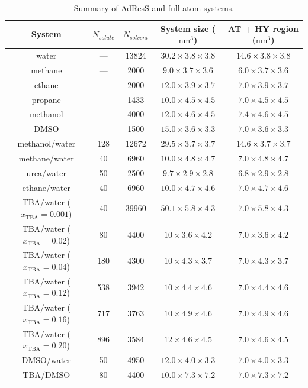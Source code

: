 \documentclass[a4paper,preprint,unsortedaddress]{revtex4-1}
\newcommand{\recheck}[1]{{\color{red} #1}}
\newcommand{\concenttba}{x_{\textrm{TBA}}}
\begin{document}
\begin{table}[]
\begin{center}
\begin{tabular}{ccccc}
\hline \hline
 System & $N_{solute}$ & $N_{solvent}$ & System size ($\textrm{nm}^{3}$) &  AT + HY region ($\textrm{nm}^{3}$)  \\
\hline
\recheck{water} & --- & 13824 & $30.2 \times 3.8 \times 3.8$ & $14.6 \times 3.8 \times 3.8$ \\
methane & --- & 2000 & $9.0 \times  3.7 \times 3.6$ & $6.0 \times 3.7 \times 3.6$ \\
ethane & --- & 2000 & $12.0 \times 3.9 \times 3.7$ & $7.0 \times 3.9 \times 3.7$ \\
propane & --- & 1433 & $10.0 \times 4.5 \times 4.5$ & $7.0 \times 4.5 \times 4.5$ \\
\recheck{methanol} & --- & 4000 & $12.0 \times 4.6 \times 4.5$ & $7.4 \times 4.6 \times 4.5$ \\
DMSO & --- & 1500 & $15.0 \times 3.6 \times 3.3$ &  $7.0 \times 3.6 \times 3.3$ \\
\recheck{methanol/water} & 128 & 12672 & $29.5 \times 3.7 \times 3.7$ & $14.6 \times 3.7 \times 3.7$ \\
\recheck{methane/water} & 40  & 6960 & $10.0 \times 4.8 \times 4.7$ & $7.0 \times 4.8 \times 4.7$ \\
urea/water & 50 & 2500 & $9.7 \times 2.9 \times 2.8$ & $6.8 \times 2.9 \times 2.8$ \\
\recheck{ethane/water} & 40 & 6960 & $10.0 \times 4.7 \times 4.6$ & $7.0 \times 4.7 \times 4.6$ \\
\recheck{TBA/water ($\concenttba=0.001$)} & 40 & 39960 & $50.1 \times 5.8 \times 4.3$ & $7.0 \times 5.8 \times 4.3$  \\
\recheck{TBA/water ($\concenttba=0.02$)} & 80 & 4400 & $10 \times 3.6 \times 4.2$ & $7.0 \times 3.6 \times 4.2$  \\
\recheck{TBA/water ($\concenttba=0.04$)} & 180 & 4300 & $10 \times 4.3 \times 3.7$ & $7.0 \times 4.3 \times 3.7$  \\
\recheck{TBA/water ($\concenttba=0.12$)} & 538 & 3942 & $10 \times 4.4 \times 4.6$ & $7.0 \times 4.4 \times 4.6$  \\
\recheck{TBA/water ($\concenttba=0.16$)} & 717 & 3763 & $10 \times 4.9 \times 4.6$ & $7.0 \times 4.9 \times 4.6$  \\
\recheck{TBA/water ($\concenttba=0.20$)} & 896 & 3584 & $12 \times 4.6 \times 4.5$ & $7.0 \times 4.6 \times 4.5$  \\
DMSO/water & 50 & 4950 & $12.0 \times 4.0 \times 3.3$ & $7.0 \times 4.0 \times 3.3$ \\
TBA/DMSO & 80 & 4400 & $10.0 \times 7.3 \times 7.2$ &  $7.0 \times 7.3 \times 7.2$ \\
\hline \hline
\end{tabular}
\caption{Summary of AdResS and full-atom systems.}
\label{table2}
\end{center}
\end{table}
\end{document}
